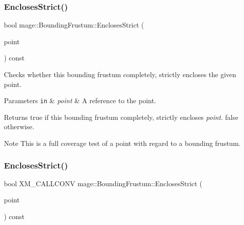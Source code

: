 \subsubsection{\texorpdfstring{Encloses\+Strict()}{EnclosesStrict()}\hspace{0.1cm}{\footnotesize\ttfamily [1/4]}}
{\footnotesize\ttfamily bool mage\+::\+Bounding\+Frustum\+::\+Encloses\+Strict (\begin{DoxyParamCaption}\item[{const \hyperlink{structmage_1_1_point3}{Point3} \&}]{point }\end{DoxyParamCaption}) const\hspace{0.3cm}{\ttfamily [noexcept]}}

Checks whether this bounding frustum completely, strictly encloses the given point.


\begin{DoxyParams}[1]{Parameters}
\mbox{\tt in}  & {\em point} & A reference to the point. \\
\hline
\end{DoxyParams}
\begin{DoxyReturn}{Returns}
{\ttfamily true} if this bounding frustum completely, strictly encloses {\itshape point}. {\ttfamily false} otherwise. 
\end{DoxyReturn}
\begin{DoxyNote}{Note}
This is a full coverage test of a point with regard to a bounding frustum. 
\end{DoxyNote}
\hypertarget{classmage_1_1_bounding_frustum_a7cd247470d192464f006b2b76ad3c336}{}\label{classmage_1_1_bounding_frustum_a7cd247470d192464f006b2b76ad3c336} 
\subsubsection{\texorpdfstring{Encloses\+Strict()}{EnclosesStrict()}\hspace{0.1cm}{\footnotesize\ttfamily [2/4]}}
{\footnotesize\ttfamily bool X\+M\+\_\+\+C\+A\+L\+L\+C\+O\+NV mage\+::\+Bounding\+Frustum\+::\+Encloses\+Strict (\begin{DoxyParamCaption}\item[{F\+X\+M\+V\+E\+C\+T\+OR}]{point }\end{DoxyParamCaption}) const\hspace{0.3cm}{\ttfamily [noexcept]}}

